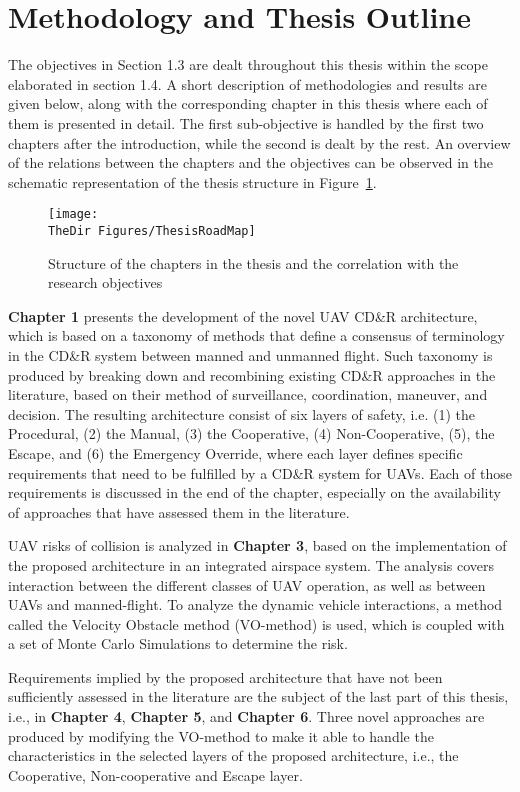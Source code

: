 \section{Methodology and Thesis Outline}
The objectives in Section 1.3 are dealt throughout this thesis within the scope elaborated in section 1.4. A short description of methodologies and results are given below, along with the corresponding chapter in this thesis where each of them is presented in detail. The first sub-objective is handled by the first two chapters after the introduction, while the second is dealt by the rest. An overview of the relations between the chapters and the objectives can be observed in the schematic representation of the thesis structure in Figure~\ref{f:ThesisRoadMap}. 

\begin{figure}[h!]
    \texttt{[image: \\TheDir Figures/ThesisRoadMap]}
	\caption{Structure of the chapters in the thesis and the correlation with the research objectives} 
	\label{f:ThesisRoadMap}
\end{figure}

\textbf{Chapter 1} presents the development of the novel UAV CD\&R architecture, which is based on a taxonomy of methods that define a consensus of terminology in the CD\&R system between manned and unmanned flight. Such taxonomy is produced by breaking down and recombining existing CD\&R approaches in the literature, based on their method of surveillance, coordination, maneuver, and decision. The resulting architecture consist of six layers of safety, i.e. (1) the Procedural, (2) the Manual, (3) the Cooperative, (4) Non-Cooperative, (5), the Escape, and (6) the Emergency Override, where each layer defines specific requirements that need to be fulfilled by a CD\&R system for UAVs. Each of those requirements is discussed in the end of the chapter, especially on the availability of approaches that have assessed them in the literature. 

UAV risks of collision is analyzed in \textbf{Chapter 3}, based on the implementation of the proposed architecture in an integrated airspace system. The analysis covers interaction between the different classes of UAV operation, as well as between UAVs and manned-flight. To analyze the dynamic vehicle interactions, a method called the Velocity Obstacle method (VO-method) is used, which is coupled with a set of Monte Carlo Simulations to determine the risk. 

Requirements implied by the proposed architecture that have not been sufficiently assessed in the literature are the subject of the last part of this thesis, i.e., in \textbf{Chapter 4}, \textbf{Chapter 5}, and \textbf{Chapter 6}. Three novel approaches are produced by modifying the VO-method to make it able to handle the characteristics in the selected layers of the proposed architecture, i.e., the Cooperative, Non-cooperative and Escape layer.


